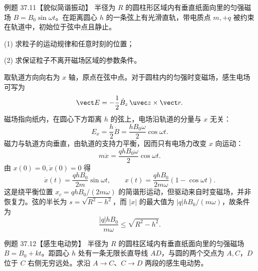 \Needspace{0.12\textheight}
\begin{origexamplebox}{例题 37.11【貌似简谐振动】}
半径为 $R$ 的圆柱形区域内有垂直纸面向里的匀强磁场
$B=B_0\sin\omega t$。在距离圆心 $h$ 的一条弦上有光滑直轨，带电质点 $m,+q$ 被约束在轨道中，初始位于弦中点且静止。

(1) 求粒子的运动规律和任意时刻的位置；

(2) 求保证粒子不离开磁场区域的参数条件。
\end{origexamplebox}

\begin{xesolution}
取轨道方向向右为 $x$ 轴，原点在弦中点。对于圆柱内的匀强时变磁场，感生电场可写为
\begin{equation}
  \vect E=-\frac12\dot B_z\,\uvec z\times\vect r.
\end{equation}
磁场指向纸内，在圆心下方距离 $h$ 的弦上，电场沿轨道的分量与 $x$ 无关：
\begin{equation}
  E_x=\frac h2\dot B=\frac{hB_0\omega}{2}\cos\omega t.
\end{equation}
磁力与轨道方向垂直，由轨道的支持力平衡，因而只有电场力改变 $x$ 向运动：
\begin{equation}
  m\ddot x=\frac{qhB_0\omega}{2}\cos\omega t.
\end{equation}
由 $x(0)=0,\dot x(0)=0$ 得
\begin{equation}
  \boxed{\dot x(t)=\frac{qhB_0}{2m}\sin\omega t},
  \qquad
  \boxed{x(t)=\frac{qhB_0}{2m\omega}(1-\cos\omega t)}.
\end{equation}
这是绕平衡位置 $x_c=qhB_0/(2m\omega)$ 的简谐形运动，但驱动来自时变磁场，并非恢复力。弦的半长为
$s=\sqrt{R^2-h^2}$，而 $|x|$ 的最大值为 $|q|hB_0/(m\omega)$，故条件为
\begin{equation}
  \boxed{\frac{|q|hB_0}{m\omega}\le\sqrt{R^2-h^2}}.
\end{equation}

\chordParticleDiagram
\end{xesolution}

\Needspace{0.12\textheight}
\begin{origexamplebox}{例题 37.12【感生电动势】}
半径为 $R$ 的圆柱区域内有垂直纸面向里的匀强磁场
$B=B_0+kt$。距圆心 $h$ 处有一条无限长直导线 $AD$，与圆的两个交点为 $A,C$，$D$ 位于 $C$ 右侧无穷远处。求沿 $A\to C$、$C\to D$ 两段的感生电动势。
\end{origexamplebox}

